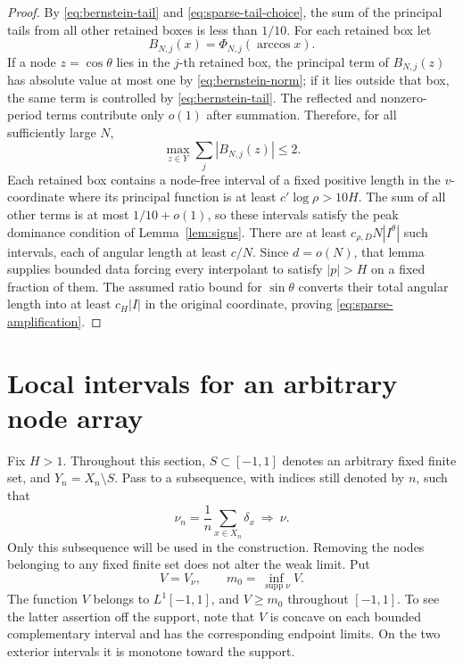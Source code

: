 \documentclass[11pt]{article}
\theoremstyle{definition}
\numberwithin{equation}{section}
\DeclareMathOperator{\supp}{supp}
\begin{document}
\begin{proof}
By \eqref{eq:bernstein-tail} and
\eqref{eq:sparse-tail-choice}, the sum of the principal tails from all
other retained boxes is less than \(1/10\). For each
retained box let
\[
 B_{N,j}(x)=\Phi_{N,j}(\arccos x).
\]
If a node \(z=\cos\theta\) lies in the \(j\)-th retained box, the
principal term of \(B_{N,j}(z)\) has absolute value at most one by
\eqref{eq:bernstein-norm}; if it lies outside that box, the same term
is controlled by \eqref{eq:bernstein-tail}. The reflected and
nonzero-period terms contribute only \(o(1)\) after summation.
Therefore, for all sufficiently large \(N\),
\begin{equation}\label{eq:sparse-node-bound}
 \max_{z\in Y}\sum_j|B_{N,j}(z)|\le2.
\end{equation}
Each retained box contains a node-free interval of a fixed positive
length in the \(v\)-coordinate where its principal function is at
least \(c'\log\rho>10H\). The sum of all other terms is at most
\(1/10+o(1)\), so these intervals satisfy the peak dominance
condition of Lemma~\ref{lem:signs}.
There are at least \(c_{\rho,D}N|I^\theta|\) such intervals, each
of angular length at least \(c/N\). Since \(d=o(N)\), that lemma
supplies bounded data forcing every interpolant to satisfy
\(|p|>H\) on a fixed fraction of them. The assumed ratio bound for
\(\sin\theta\) converts their total angular length into at least
\(c_H|I|\) in the original coordinate, proving
\eqref{eq:sparse-amplification}.
\end{proof}

\section{Local intervals for an arbitrary node array}
\label{sec:arbitrary}

Fix \(H>1\). Throughout this section, \(S\subset[-1,1]\) denotes
an arbitrary fixed finite set, and \(Y_n=X_n\setminus S\).
Pass to a subsequence, with indices still denoted by \(n\), such that
\begin{equation}\label{eq:weak-limit}
 \nu_n=\frac1n\sum_{x\in X_n}\delta_x
 \ \Longrightarrow\ \nu.
\end{equation}
Only this subsequence will be used in the construction.
Removing the nodes belonging to any fixed finite set does not
alter the weak limit.
Put
\[
 V=V_\nu,\qquad
 m_0=\inf_{\supp\nu}V.
\]
The function \(V\) belongs to \(L^1[-1,1]\), and \(V\ge m_0\)
throughout \([-1,1]\).
To see the latter assertion off the support, note that \(V\) is
concave on each bounded complementary interval and has the
corresponding endpoint limits. On the two exterior intervals it
is monotone toward the support.
\end{document}
